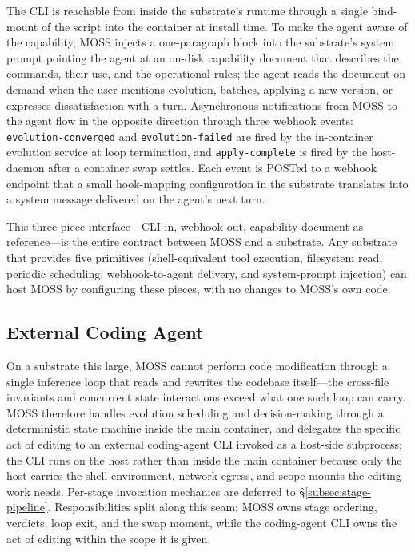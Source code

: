 The CLI is reachable from inside the substrate's runtime through a single bind-mount of the script into the container at install time. To make the agent aware of the capability, MOSS injects a one-paragraph block into the substrate's system prompt pointing the agent at an on-disk capability document that describes the commands, their use, and the operational rules; the agent reads the document on demand when the user mentions evolution, batches, applying a new version, or expresses dissatisfaction with a turn. Asynchronous notifications from MOSS to the agent flow in the opposite direction through three webhook events: \texttt{evolution-converged} and \texttt{evolution-failed} are fired by the in-container evolution service at loop termination, and \texttt{apply-complete} is fired by the host-daemon after a container swap settles. Each event is POSTed to a webhook endpoint that a small hook-mapping configuration in the substrate translates into a system message delivered on the agent's next turn.

This three-piece interface---CLI in, webhook out, capability document as reference---is the entire contract between MOSS and a substrate. Any substrate that provides five primitives (shell-equivalent tool execution, filesystem read, periodic scheduling, webhook-to-agent delivery, and system-prompt injection) can host MOSS by configuring these pieces, with no changes to MOSS's own code.

\subsection{External Coding Agent}
\label{subsec:external-coding-agent}

On a substrate this large, MOSS cannot perform code modification through a single inference loop that reads and rewrites the codebase itself---the cross-file invariants and concurrent state interactions exceed what one such loop can carry. MOSS therefore handles evolution scheduling and decision-making through a deterministic state machine inside the main container, and delegates the specific act of editing to an external coding-agent CLI invoked as a host-side subprocess; the CLI runs on the host rather than inside the main container because only the host carries the shell environment, network egress, and scope mounts the editing work needs. Per-stage invocation mechanics are deferred to \S\ref{subsec:stage-pipeline}. Responsibilities split along this seam: MOSS owns stage ordering, verdicts, loop exit, and the swap moment, while the coding-agent CLI owns the act of editing within the scope it is given.

